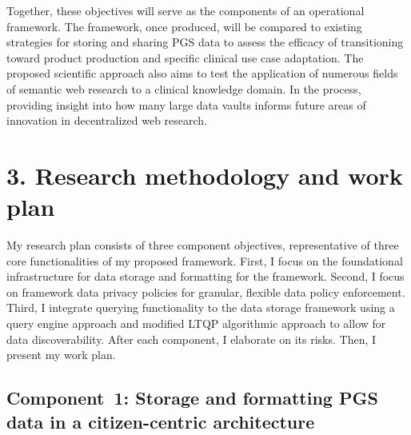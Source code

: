 \documentclass[a4paper,11pt]{article}
\begin{document}
\begin{refsection}
Together, these objectives will serve as the components of an operational framework. 
The framework, once produced, will be compared to existing strategies for storing and sharing PGS data to assess the efficacy of transitioning toward product production and specific clinical use case adaptation.
The proposed scientific approach also aims to test the application of numerous fields of semantic web research to a clinical knowledge domain. 
In the process, providing insight into how many large data vaults informs future areas of innovation in decentralized web research.

\newpage

\section{3. Research methodology and work plan}

\begin{comment}
\textit{Elaborate the different envisaged steps (experiments/activities) in your research, and motivate strategic choices in view of reaching the objectives. Describe the set-up and cohesion of the work packages including intermediate goals (milestones).
Show where the proposed methodology (research approach) is according to the state of the art and where it is novel. Discuss risks that might endanger reaching project objectives and the contingency plans to be put in place should this risk occur.
Use a table or graphic representation of the planned course of activities (timing work packages, milestones, critical path) over the 4-years grant period.}
\end{comment}

\medskip

\noindent
My research plan consists of three component objectives, representative of three core functionalities of my proposed framework.
%
First, I focus on the foundational infrastructure for data storage and formatting for the framework.
%
Second, I focus on framework data privacy policies for granular, flexible data policy enforcement.
%
Third, I integrate querying functionality to the data storage framework using a query engine approach and modified LTQP algorithmic approach to allow for data discoverability.
%
After each component, I elaborate on its risks.
Then, I present my work plan.

\newcommand\WPa{Storage and formatting PGS data in a citizen-centric architecture}
\subsection{Component~1: \WPa}


\end{refsection}
\end{document}

